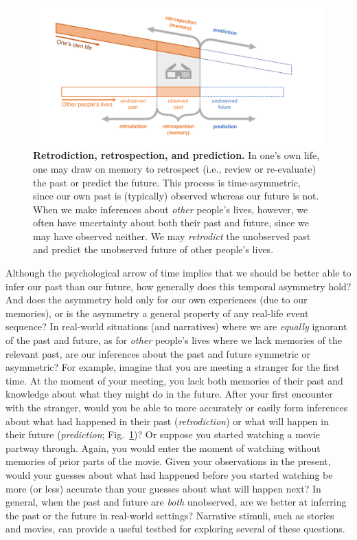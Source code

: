 \documentclass[10pt]{article}
\providecommand{\DIFaddbeginFL}{} %
\providecommand{\DIFaddendFL}{} %
\newcommand{\DIFaddincludegraphics}[2][]{{\color{blue}\fbox{\DIFOincludegraphics[#1]{#2}}}} %
\DeclareRobustCommand{\DIFaddbeginFL}{\DIFOaddbeginFL \let\includegraphics\DIFaddincludegraphics} %
\DeclareRobustCommand{\DIFaddendFL}{\DIFOaddendFL \let\includegraphics\DIFOincludegraphics} %
\begin{document}
\begin{figure}[tp]
  \centering
  \includegraphics[width=\textwidth]{intro1}
\DIFaddbeginFL 

  \DIFaddendFL \caption{\textbf{Retrodiction, retrospection, and prediction.} In one's own
  life, one may draw on memory to retrospect (i.e., review or re-evaluate) the
  past or predict the future. This process is time-asymmetric, since our own
  past is (typically) observed whereas our future is not. When we make
  inferences about \textit{other} people's lives, however, we often have
  uncertainty about both their past and future, since we may have observed
  neither. We may \textit{retrodict} the unobserved past and predict the
  unobserved future of other people's lives.}
\DIFaddbeginFL 

  \DIFaddendFL \label{fig:intro1}
\end{figure}

Although the psychological arrow of time implies that we should be better able
to infer our past than our future, how generally does this temporal asymmetry
hold? And does the asymmetry hold only for our own experiences (due to our
memories), or is the asymmetry a general property of any real-life event
sequence? In real-world situations (and narratives) where we are
\textit{equally} ignorant of the past and future, as for \textit{other}
people's lives where we lack memories of the relevant past, are our inferences
about the past and future symmetric or asymmetric? For example, imagine that
you are meeting a stranger for the first time. At the moment of your meeting,
you lack both memories of their past and knowledge about what they might do in
the future. After your first encounter with the stranger, would you be able to
more accurately or easily form inferences about what had happened in their past
(\textit{retrodiction}) or what will happen in their future
(\textit{prediction}; Fig.~\ref{fig:intro1})? Or suppose you started watching a
movie partway through. Again, you would enter the moment of watching without
memories of prior parts of the movie. Given your observations in the present,
would your guesses about what had happened before you started watching be more
(or less) accurate than your guesses about what will happen next? In general,
when the past and future are \textit{both} unobserved, are we better at
inferring the past or the future in real-world settings? Narrative stimuli,
such as stories and movies, can provide a useful testbed for exploring several
of these questions.
\end{document}

